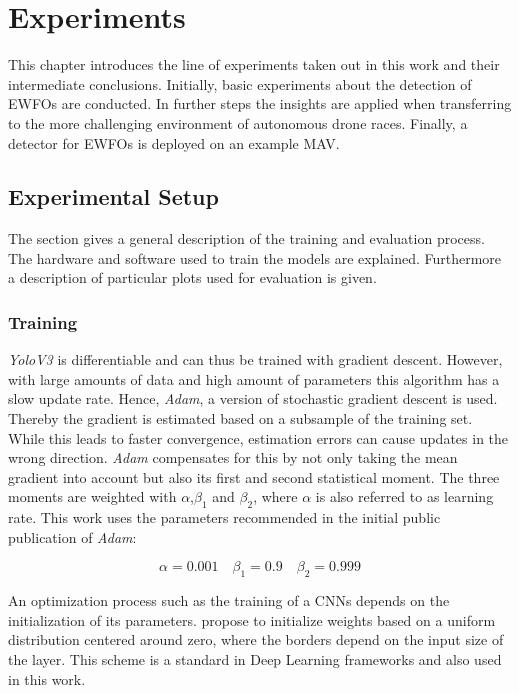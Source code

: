 \chapter{Experiments}

This chapter introduces the line of experiments taken out in this work and their intermediate conclusions. Initially, basic experiments about the detection of \acp{EWFO} are conducted. In further steps the insights are applied when transferring to the more challenging environment of autonomous drone races. Finally, a detector for \acp{EWFO} is deployed on an example \ac{MAV}.

\section{Experimental Setup}

The section gives a general description of the training and evaluation process. The hardware and software used to train the models are explained. Furthermore a description of particular plots used for evaluation is given.

\subsection{Training}

\textit{YoloV3} is differentiable and can thus be trained with gradient descent. However, with large amounts of data and high amount of parameters this algorithm has a slow update rate. Hence, \textit{Adam}\cite{Kingma2014}, a version of stochastic gradient descent is used. Thereby the gradient is estimated based on a subsample of the training set. While this leads to faster convergence, estimation errors can cause updates in the wrong direction. \textit{Adam} compensates for this by not only taking the mean gradient into account but also its first and second statistical moment. The three moments are weighted with $\alpha$,$\beta_1$ and $\beta_2$, where $\alpha$ is also referred to as learning rate. This work uses the parameters recommended in the initial public publication of \textit{Adam}\cite{Kingma2014}:

$$\alpha=0.001 \quad \beta_1=0.9 \quad \beta_2=0.999$$

An optimization process such as the training of a \acp{CNN} depends on the initialization of its parameters. \citeauthor{Glorot2010} \cite{Glorot2010} propose to initialize weights based on a uniform distribution centered around zero, where the borders depend on the input size of the layer. This scheme is a standard in Deep Learning frameworks and also used in this work.

